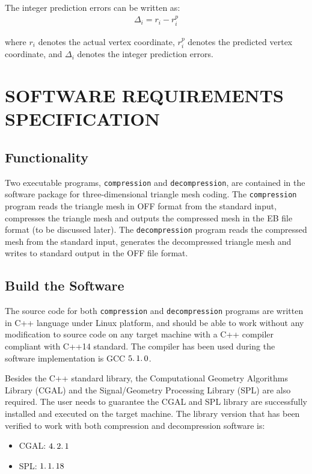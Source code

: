 \documentclass[onecolumn, 12pt]{article}
\begin{document}
The integer prediction errors can be written as:
\begin{align}\label{eq:delta}
\Delta_i = r_i - r^p_i
\end{align}

where $r_i$ denotes the actual vertex coordinate, $r^p_i$ denotes the predicted vertex coordinate, and $\Delta_i$ denotes the integer prediction errors.



\section{SOFTWARE REQUIREMENTS SPECIFICATION} \label{sec:SRS}
\subsection{Functionality}
Two executable programs, \lstinline!compression! and \lstinline!decompression!, are contained in the software package for three-dimensional triangle mesh coding. The \lstinline!compression! program reads the triangle mesh in OFF format from the standard input, compresses the triangle mesh and outputs the compressed mesh in the EB file format (to be discussed later). The \lstinline!decompression! program reads the compressed mesh from the standard input, generates the decompressed triangle mesh and writes to standard output in the OFF file format.


\subsection{Build the Software}
The source code for both \lstinline{compression} and \lstinline{decompression} programs are written in C++ language under Linux platform, and should be able to work without any modification to source code on any target machine with a C++ compiler compliant with C++14 standard. The compiler has been used during the software implementation is GCC $5\ldotp 1\ldotp0$.

Besides the C++ standard library, the Computational Geometry Algorithms Library (CGAL) and the Signal/Geometry Processing Library (SPL) are also required. The user needs to guarantee the CGAL and SPL library are successfully installed and executed on the target machine. The library version that has been verified to work with both compression and decompression software is:
\begin{itemize}\itemsep=2pt
\item CGAL: $4\ldotp 2\ldotp 1$
\item SPL: $1\ldotp 1\ldotp 18$
\end{itemize}
\end{document}
